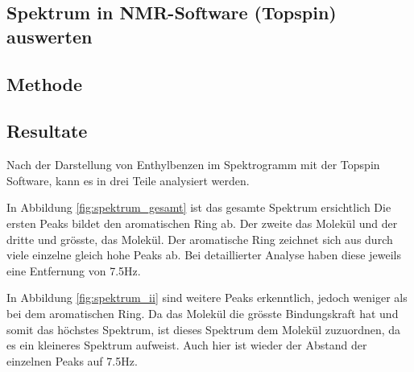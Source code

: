 \documentclass[a4paper]{article}
\newenvironment{Figure}
	{\par\medskip\noindent\minipage{\linewidth}}
	{\endminipage\par\medskip}
\begin{document}
	\begin{multicols}{2}
		\section{Spektrum in NMR-Software (Topspin) auswerten}
		
			\subsection{Methode}
			
		
			\begin{Figure}
				\centering
				\label{fig:molekul}
				\vspace*{0.5mm}
			\end{Figure}
		
			\subsection{Resultate}
				
				
				\setlength{\parindent}{0mm}
				\setlength{\parskip}{2mm}
				
				Nach der Darstellung von Enthylbenzen im Spektrogramm mit der Topspin Software, 
				kann es in drei Teile analysiert werden.
				
				In Abbildung \ref{fig:spektrum_gesamt} ist das gesamte Spektrum ersichtlich
				Die ersten Peaks bildet den aromatischen Ring ab. Der zweite das 
				Molekül und der dritte und grösste, das  Molekül. Der aromatische Ring zeichnet
				sich aus durch viele einzelne gleich hohe Peaks ab. Bei detaillierter Analyse haben
				diese jeweils eine Entfernung von 7.5Hz.
				
				In Abbildung \ref{fig:spektrum_ii} sind weitere Peaks
				erkenntlich, jedoch weniger als bei dem aromatischen Ring. Da das  Molekül die
				grösste Bindungskraft hat und somit das höchstes Spektrum, ist dieses Spektrum dem
				 Molekül zuzuordnen, da es ein kleineres Spektrum aufweist.
				Auch hier ist wieder der Abstand der einzelnen Peaks auf 7.5Hz.
				

\end{multicols}
\end{document}
